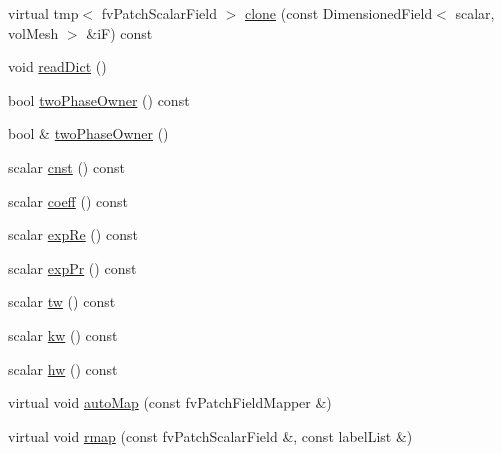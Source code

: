 \begin{DoxyCompactItemize}
virtual tmp$<$ fv\+Patch\+Scalar\+Field $>$ \hyperlink{classFoam_1_1compressible_1_1NusseltThermalBaffle1DFvPatchScalarField_a617bc55e78cf53196df9217431e5aa96}{clone} (const Dimensioned\+Field$<$ scalar, vol\+Mesh $>$ \&iF) const
\item 
void \hyperlink{classFoam_1_1compressible_1_1NusseltThermalBaffle1DFvPatchScalarField_a09f8bbb748b599cf713fa2e07ec7e0b4}{read\+Dict} ()
\item 
bool \hyperlink{classFoam_1_1compressible_1_1NusseltThermalBaffle1DFvPatchScalarField_a416ce0f7d2a6994c1cdf5b11e555792e}{two\+Phase\+Owner} () const
\item 
bool \& \hyperlink{classFoam_1_1compressible_1_1NusseltThermalBaffle1DFvPatchScalarField_acc58177e28dc1d0294e3737589f0f80e}{two\+Phase\+Owner} ()
\item 
scalar \hyperlink{classFoam_1_1compressible_1_1NusseltThermalBaffle1DFvPatchScalarField_a64eb7165174826df2f366e4d1eb451b1}{cnst} () const
\item 
scalar \hyperlink{classFoam_1_1compressible_1_1NusseltThermalBaffle1DFvPatchScalarField_a10ad640048381f4f9ed7d985fe851faf}{coeff} () const
\item 
scalar \hyperlink{classFoam_1_1compressible_1_1NusseltThermalBaffle1DFvPatchScalarField_a9a3f01e9640097bb240b56271a891c2a}{exp\+Re} () const
\item 
scalar \hyperlink{classFoam_1_1compressible_1_1NusseltThermalBaffle1DFvPatchScalarField_a83f6b06187abec4002b3dabdcedacf3c}{exp\+Pr} () const
\item 
scalar \hyperlink{classFoam_1_1compressible_1_1NusseltThermalBaffle1DFvPatchScalarField_abb443c006883d2fb80212a2bdf244305}{tw} () const
\item 
scalar \hyperlink{classFoam_1_1compressible_1_1NusseltThermalBaffle1DFvPatchScalarField_a3101983b74b23f65da1c3a565c0b547e}{kw} () const
\item 
scalar \hyperlink{classFoam_1_1compressible_1_1NusseltThermalBaffle1DFvPatchScalarField_a6cede45c1679c468b754a0e3ee13a159}{hw} () const
\item 
virtual void \hyperlink{classFoam_1_1compressible_1_1NusseltThermalBaffle1DFvPatchScalarField_a0ab0c43ce90d756c88dd81e3d0a9eef5}{auto\+Map} (const fv\+Patch\+Field\+Mapper \&)
\item 
virtual void \hyperlink{classFoam_1_1compressible_1_1NusseltThermalBaffle1DFvPatchScalarField_a713277715ccc0a5ef466b0516d44731f}{rmap} (const fv\+Patch\+Scalar\+Field \&, const label\+List \&)
\item 

\end{DoxyCompactItemize}
